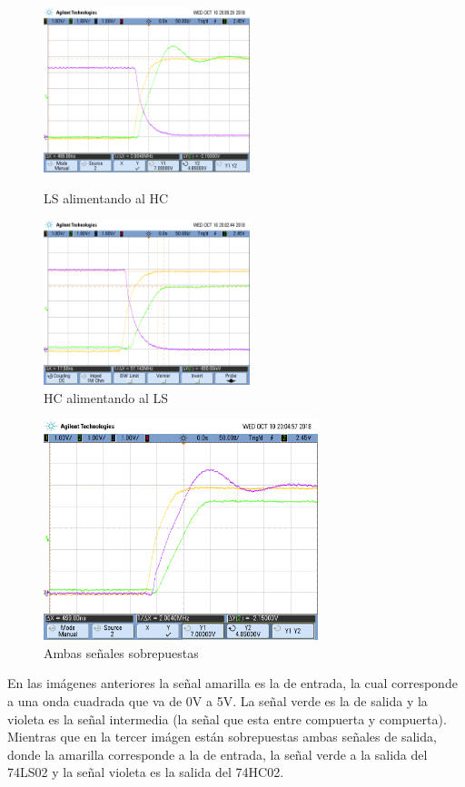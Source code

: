 \begin{figure}[H]
\begin{center}
  \begin{minipage}[b]{0.4\textwidth}
  	\begin{center}
  		\includegraphics[width=6cm]{ejercicio2/OSC_LS_HC.png}
		\caption{LS alimentando al HC}
  	\end{center}
  \end{minipage}
  \begin{minipage}[b]{0.4\textwidth}
    \begin{center}
  		\includegraphics[width=6cm]{ejercicio2/OSC_HC_LS.png}
		\caption{HC alimentando al LS}
	\end{center}
 \end{minipage}
\end{center}
\end{figure}

\begin{figure}[hbtp]
	\centering
		\includegraphics[width=8cm]{ejercicio2/OSC_AMBAS.png}
	\caption{Ambas señales sobrepuestas}
\end{figure}

En las im\'agenes anteriores la señal amarilla es la de entrada, la cual corresponde a una onda cuadrada que va de 0V a 5V. La señal verde es la de salida y la violeta es la señal intermedia (la señal que esta entre compuerta y compuerta). Mientras que en la tercer im\'agen est\'an sobrepuestas ambas señales de salida, donde la amarilla corresponde a la de entrada, la señal verde a la salida del 74LS02 y la señal violeta es la salida del 74HC02.




